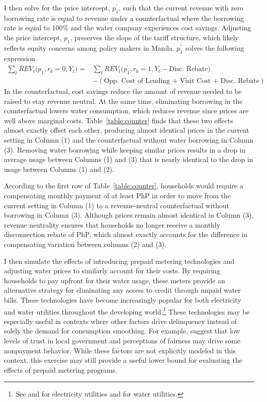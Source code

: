 \documentclass[12pt]{article}
\begin{document}
I then solve for the price intercept, $p^{\prime}_1$, such that the current revenue with zero borrowing rate is equal to revenue under a counterfactual where the borrowing rate is equal to 100\% and the water company experiences cost savings.  Adjusting the price intercept, $p_1$, preserves the slope of the tariff structure, which likely reflects equity concerns among policy makers in Manila.  $p^{\prime}_1$ solves the following expression
\begin{align*}
\sum_t REV_t \big(p_1,r_b = 0,Y_t \big) =& \sum_t REV_t \big(p^{\prime}_1,r_b = 1, Y_t - \text{Disc. Rebate} \big) \\
& - (\text{Opp. Cost of Lending + Visit Cost + Disc. Rebate})
\end{align*}
In the counterfactual, cost savings reduce the amount of revenue needed to be raised to stay revenue neutral.  At the same time, eliminating borrowing in the counterfactual lowers water consumption, which reduces revenue since prices are well above marginal costs.  Table~\ref{table:counter} finds that these two effects almost exactly offset each other, producing almost identical prices in the current setting in Column (1) and the counterfactual without water borrowing in Column (3).  Removing water borrowing while keeping similar prices results in a drop in average usage between Columns (1) and (3) that is nearly identical to the drop in usage between Columns (1) and (2).

According to the first row of Table~\ref{table:counter}, households would require a compensating monthly payment of at least PhP in order to move from the current setting in  Column (1) to a revenue-neutral counterfactual without borrowing in Column (3).  Although prices remain almost identical in Column (3), revenue neutrality ensures that households no longer receive a monthly disconnection rebate of PhP, which almost exactly accounts for the difference in compensating variation between columns (2) and (3).  


I then simulate the effects of introducing prepaid metering technologies and adjusting water prices to similarly account for their costs. By requiring households to pay upfront for their water usage, these meters provide an alternative strategy for  eliminating any access to credit through unpaid water bills.  These technologies have become increasingly popular for both electricity and water utilities throughout the developing world.\footnote{See \cite{jack2016charging} and \cite{northeast2014} for electricity utilities and \cite{heymans2014limits} for water utilities.}  These technologies may be especially useful in contexts where other factors drive delinquency instead of solely the demand for consumption smoothing.   For example, \cite{szabo2015reducing} suggest that low levels of trust in local government and perceptions of fairness may drive some nonpayment behavior.  While these factors are not explicitly modeled in this context, this exercise may still provide a useful lower bound for evaluating the effects of prepaid metering programs.
\end{document}
